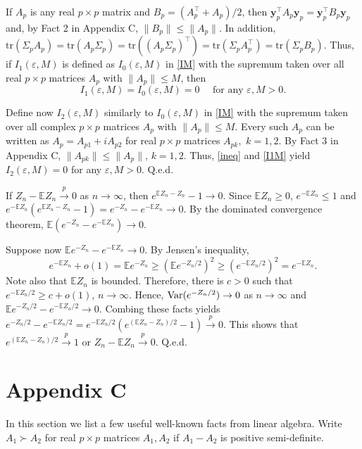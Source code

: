 \documentclass[12pt, a4paper]{article}
\newcommand\y{{\mathbf y}}
\newcommand\pto{\stackrel p\rightarrow}
\newcommand\e{{\mathbb E}}
\newcommand\var{{\rm Var}}
\newcommand\tr{{\mathrm{tr}}}
\begin{document}
If $A_p$ is any real $p\times p$ matrix and $B_p=( A_p^\top +A_p)/2$, then $\y_p^\top A_p\y_p= \y_p^\top B_p\y_p$ and, by Fact 2 in Appendix C, $\|B_p\|\leqslant \|A_p\|.$
In addition, $\tr(\Sigma_pA_p)=\tr( A_p\Sigma_p)=\tr(( A_p\Sigma_p)^\top)=\tr(\Sigma_pA_p^\top )=\tr(\Sigma_pB_p).$
Thus, if $I_1(\varepsilon,M)$ is defined as $I_0(\varepsilon,M)$ in \eqref{IM} with the supremum taken over all  real $p\times p$ matrices $A_p$ with  $\|A_p\|\leqslant M$, then  
\begin{equation}\label{I1M}
I_1(\varepsilon,M)=I_0(\varepsilon,M)=0\quad\text{ for any $\varepsilon,M>0.$}
\end{equation}

 Define  now $I_2(\varepsilon,M)$ similarly to  $I_0(\varepsilon,M)$ in \eqref{IM} with the supremum taken over all  complex $p\times p$ matrices $A_p$ with  $\|A_p\|\leqslant M$. Every such  $A_p$ can be written as $A_p=A_{p1}+iA_{p2}$ for real $p\times p$ matrices $A_{pk},$ $k=1,2.$ By Fact 3 in Appendix C,  $
\|A_{pk}\|\leqslant \|A_p\|$, $k=1,2$. Thus,  \eqref{ineq} and \eqref{I1M} yield $I_2(\varepsilon,M)=0$ for any $\varepsilon,M>0.$ Q.e.d.



 If $Z_n-\e Z_n\pto 0$ as $n\to\infty$, then $e^{\e Z_n-Z_n}-1\to 0$. Since $\e Z_n\geqslant 0$,   $e^{-\e Z_n }\leqslant 1$ and $e^{-\e Z_n}(e^{\e Z_n-Z_n}-1)= e^{-Z_n}-e^{-\e Z_n}\to 0$. By the dominated convergence theorem, $\e (e^{-Z_n}-e^{-\e Z_n})\to 0$.

Suppose now $\e e^{-Z_n}-e^{-\e Z_n}\to 0$.  By Jensen's inequality, 
\[ e^{-\e Z_n}+o(1) = \e e^{-Z_n}\geqslant  (\e e^{-Z_n/2})^2\geqslant (e^{-\e Z_n/2})^2= e^{-\e Z_n}.\]
Note also that $\e Z_n$ is bounded. Therefore, there is $c>0$ such that $e^{-\e Z_n/2}\geqslant c+o(1)$, $n\to\infty.$
Hence, $\var(e^{-Z_n/2})\to0$ as $n\to\infty$ and $\e e^{-Z_n/2}-e^{-\e Z_n/2}\to0.$ Combing these facts yields $e^{-Z_n/2}-e^{-\e Z_n/2}=e^{-\e Z_n/2}(e^{(\e Z_n-Z_n)/2}-1)\pto0$.  This shows that $e^{(\e Z_n-Z_n)/2}\pto 1$ or $Z_n-\e Z_n\pto0$. Q.e.d.

\section*{Appendix C}
In this section we list a few useful well-known  facts from linear algebra. Write $A_1\succ A_2$ for real $p\times p$ matrices $A_1,A_2$ if $A_1-A_2$ is positive semi-definite. 
\end{document}
